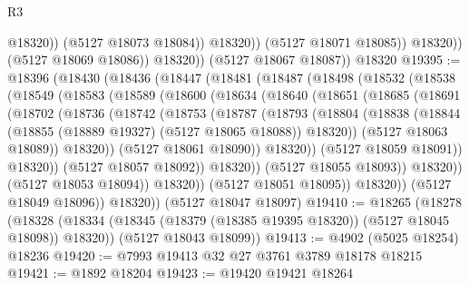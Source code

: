 \begin{lexlean}{R3}
\begin{coremodule}
                            @18320))
                        (@5127 @18073 @18084))
                      @18320))
                  (@5127 @18071 @18085))
                @18320))
            (@5127 @18069 @18086))
          @18320))
      (@5127 @18067 @18087))
    @18320
@19395 := @18396
    (@18430
      (@18436
        (@18447
          (@18481
            (@18487
              (@18498
                (@18532
                  (@18538
                    (@18549
                      (@18583
                        (@18589
                          (@18600
                            (@18634
                              (@18640
                                (@18651
                                  (@18685
                                    (@18691
                                      (@18702
                                        (@18736
                                          (@18742
                                            (@18753
                                              (@18787
                                                (@18793
                                                  (@18804
                                                    (@18838
                                                      (@18844
                                                        (@18855
                                                          (@18889 @19327)
                                                          (@5127 @18065 @18088))
                                                        @18320))
                                                    (@5127 @18063 @18089))
                                                  @18320))
                                              (@5127 @18061 @18090))
                                            @18320))
                                        (@5127 @18059 @18091))
                                      @18320))
                                  (@5127 @18057 @18092))
                                @18320))
                            (@5127 @18055 @18093))
                          @18320))
                      (@5127 @18053 @18094))
                    @18320))
                (@5127 @18051 @18095))
              @18320))
          (@5127 @18049 @18096))
        @18320))
    (@5127 @18047 @18097)
@19410 := @18265
    (@18278
      (@18328 (@18334 (@18345 (@18379 (@18385 @19395 @18320)) (@5127 @18045 @18098)) @18320))
      (@5127 @18043 @18099))
@19413 := @4902 (@5025 @18254) @18236
@19420 := @7993 @19413 @32 @27 @3761 @3789 @18178 @18215
@19421 := @1892 @18204
@19423 := @19420 @19421 @18264

\end{coremodule}
\end{lexlean}
